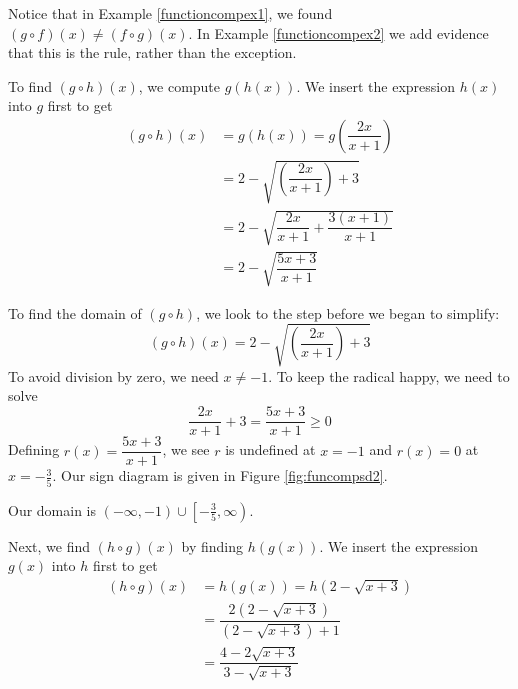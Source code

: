 \medskip

Notice that in Example \ref{functioncompex1}, we found $(g\circ f)(x)\neq (f\circ g)(x)$. In Example \ref{functioncompex2} we add evidence that this is the rule, rather than the exception.\\

\medskip

{
To find $(g \circ h)(x)$, we compute $g(h(x))$.  We insert the expression $h(x)$ into $g$ first to get 
\begin{align*}
(g \circ h)(x) & = g(h(x)) = g\left(\dfrac{2x}{x+1}\right)\\
 & = 2 - \sqrt{\left(\dfrac{2x}{x+1}\right)+3}\\
 & = 2 - \sqrt{\dfrac{2x}{x+1} + \dfrac{3(x+1)}{x+1}} \tag*{get common denominators}\\ 
 & = 2 - \sqrt{\dfrac{5x+3}{x+1}}
 \end{align*}


To find the domain of $(g \circ h)$, we look to the step before we began to simplify: \[(g \circ h)(x) = 2 - \sqrt{\left(\frac{2x}{x+1}\right)+3}\]  To avoid division by zero, we need $x \neq -1$. To keep the radical happy, we need to solve \[\frac{2x}{x+1} +3  = \frac{5x+3}{x+1}\geq 0\] Defining $r(x) = \dfrac{5x+3}{x+1}$, we see $r$ is undefined at $x=-1$ and $r(x) = 0$ at $x = -\frac{3}{5}$. Our sign diagram is given in Figure \ref{fig:funcompsd2}.


Our domain is $(-\infty, -1) \cup \left[-\frac{3}{5}, \infty\right)$.

\medskip


Next, we find $(h \circ g)(x)$ by finding $h(g(x))$. We insert the expression $g(x)$ into $h$ first to get
\begin{align*}
(h \circ g)(x) & = h(g(x)) =h\left(2-\sqrt{x+3}\right) \\
 & = \dfrac{2 \left(2-\sqrt{x+3} \right)}{\left(2-\sqrt{x+3}\right)+1}\\
 & = \dfrac{4-2\sqrt{x+3}}{3-\sqrt{x+3}}
  \end{align*}


}
